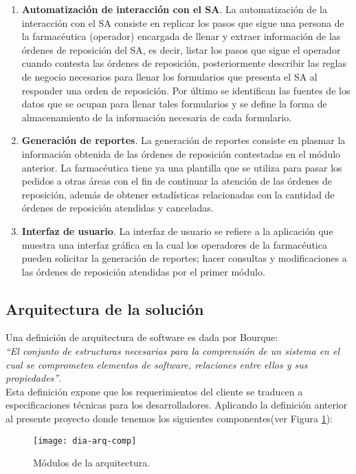 \begin{enumerate}
\item \textbf{Automatización de interacción con el SA}. La automatización de la interacción con el SA consiste en replicar los pasos que sigue una persona de la farmacéutica (operador) encargada de llenar y extraer información de las órdenes de reposición del SA, es decir, listar los pasos que sigue el operador cuando contesta las órdenes de reposición, posteriormente describir las reglas de negocio necesarios para llenar los formularios que presenta el SA al responder una orden de reposición. Por último se identifican las fuentes de los datos que se ocupan para llenar tales formularios y se define la forma de almacenamiento de la información necesaria de cada formulario.
\item \textbf{Generación de reportes}. La generación de reportes consiste en plasmar la información obtenida de las órdenes de reposición contestadas en el módulo anterior. La farmacéutica tiene ya una plantilla que se utiliza para pasar los pedidos a otras áreas con el fin de continuar la atención de las órdenes de reposición, además de obtener estadísticas relacionadas con la cantidad de órdenes de reposición atendidas y canceladas.
\item \textbf{Interfaz de usuario}. La interfaz de usuario se refiere a la aplicación que muestra una interfaz gráfica en la cual los operadores de la farmacéutica pueden solicitar la generación de reportes; hacer consultas y modificaciones a las órdenes de reposición atendidas por el primer módulo.
\end{enumerate}

\subsection{Arquitectura de la solución}
Una definición de arquitectura de software es dada por Bourque:\\
\textit{``El conjunto de estructuras necesarias para la comprensión de un sistema en el cual se comprometen elementos de software, relaciones entre ellos y sus propiedades''}\cite{SWEBOOK}.\\
Esta definición expone que los requerimientos del cliente se traducen a especificaciones técnicas para los desarrolladores. Aplicando la definición anterior al presente proyecto donde tenemos los siguientes componentes(ver Figura \ref{fig:dia-arq-comp}):
\begin{figure}[h]
\centering
\texttt{[image: dia-arq-comp]} 
\caption{Módulos de la arquitectura.}
\label{fig:dia-arq-comp}
\end{figure}

